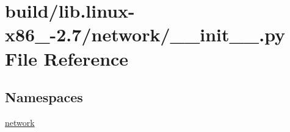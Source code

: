 \hypertarget{build_2lib_8linux-x86__64-2_87_2network_2____init_____8py}{}\section{build/lib.linux-\/x86\+\_-\/2.7/network/\+\_\+\+\_\+init\+\_\+\+\_\+.py File Reference}
\label{build_2lib_8linux-x86__64-2_87_2network_2____init_____8py}
\subsection*{Namespaces}
\begin{DoxyCompactItemize}
\item 
 \hyperlink{namespacenetwork}{network}
\end{DoxyCompactItemize}
